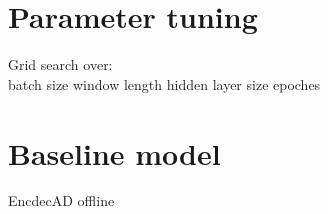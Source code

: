 \section{Parameter tuning}
\label{sec:parametertuning}

Grid search over: \\
batch size
window length
hidden layer size
epoches


\section{Baseline model}
\label{baseline}
EncdecAD offline










